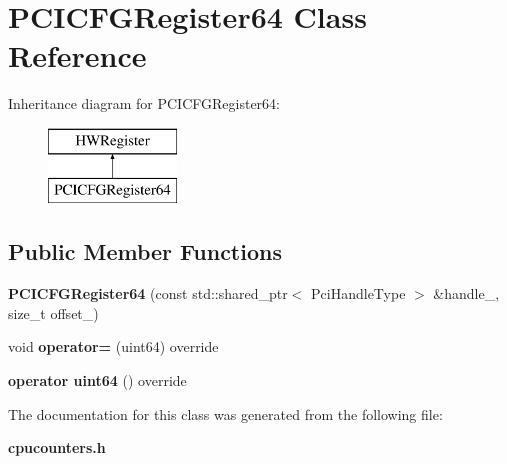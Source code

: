 \section{P\+C\+I\+C\+F\+G\+Register64 Class Reference}
\label{classPCICFGRegister64}
Inheritance diagram for P\+C\+I\+C\+F\+G\+Register64\+:\begin{figure}[H]
\begin{center}
\leavevmode
\includegraphics[height=2.000000cm]{classPCICFGRegister64}
\end{center}
\end{figure}
\subsection*{Public Member Functions}
\begin{DoxyCompactItemize}
\item 
\mbox{\label{classPCICFGRegister64_a1796f3135d6be7a668f810f409906ca2}} 
{\bfseries P\+C\+I\+C\+F\+G\+Register64} (const std\+::shared\+\_\+ptr$<$ Pci\+Handle\+Type $>$ \&handle\+\_\+, size\+\_\+t offset\+\_\+)
\item 
\mbox{\label{classPCICFGRegister64_a0551115e79f20114e6df4f353f00abad}} 
void {\bfseries operator=} (uint64) override
\item 
\mbox{\label{classPCICFGRegister64_aefd80a10fec3236d6a6ae9cdaf5ec71c}} 
{\bfseries operator uint64} () override
\end{DoxyCompactItemize}


The documentation for this class was generated from the following file\+:\begin{DoxyCompactItemize}
\item 
\textbf{ cpucounters.\+h}\end{DoxyCompactItemize}
